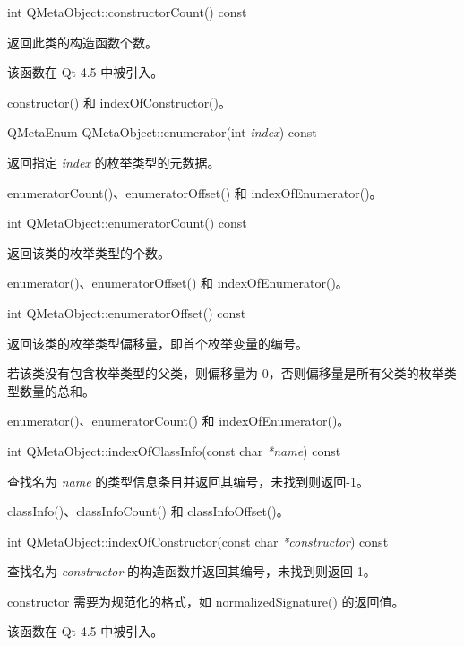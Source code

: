 int QMetaObject::constructorCount() const

返回此类的构造函数个数。

该函数在 Qt 4.5 中被引入。

\begin{notice}[另请参阅]
constructor() 和 indexOfConstructor()。
\end{notice}

QMetaEnum QMetaObject::enumerator(int \emph{index}) const

返回指定 \emph{index} 的枚举类型的元数据。

\begin{notice}[另请参阅]
enumeratorCount()、enumeratorOffset() 和 indexOfEnumerator()。
\end{notice}

int QMetaObject::enumeratorCount() const

返回该类的枚举类型的个数。

\begin{notice}[另请参阅]
enumerator()、enumeratorOffset() 和 indexOfEnumerator()。
\end{notice}
	
int QMetaObject::enumeratorOffset() const

返回该类的枚举类型偏移量，即首个枚举变量的编号。

若该类没有包含枚举类型的父类，则偏移量为 0，否则偏移量是所有父类的枚举类型数量的总和。

\begin{notice}[另请参阅]
enumerator()、enumeratorCount() 和 indexOfEnumerator()。
\end{notice}

int QMetaObject::indexOfClassInfo(const char \emph{*name}) const

查找名为 \emph{name} 的类型信息条目并返回其编号，未找到则返回-1。

\begin{notice}[另请参阅]
classInfo()、classInfoCount() 和 classInfoOffset()。
\end{notice}

int QMetaObject::indexOfConstructor(const char \emph{*constructor}) const

查找名为 \emph{constructor} 的构造函数并返回其编号，未找到则返回-1。

\begin{notice}
constructor 需要为规范化的格式，如 normalizedSignature() 的返回值。
\end{notice}

该函数在 Qt 4.5 中被引入。

